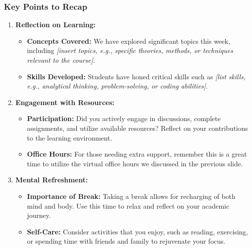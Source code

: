 \documentclass[aspectratio=169]{beamer}
\begin{document}
\begin{frame}[fragile]
    \frametitle{Key Points to Recap}
    \begin{enumerate}
        \item \textbf{Reflection on Learning:}
        \begin{itemize}
            \item \textbf{Concepts Covered:} We have explored significant topics this week, including \textit{[insert topics, e.g., specific theories, methods, or techniques relevant to the course]}.
            \item \textbf{Skills Developed:} Students have honed critical skills such as \textit{[list skills, e.g., analytical thinking, problem-solving, or coding abilities]}.
        \end{itemize}
        
        \item \textbf{Engagement with Resources:}
        \begin{itemize}
            \item \textbf{Participation:} Did you actively engage in discussions, complete assignments, and utilize available resources? Reflect on your contributions to the learning environment.
            \item \textbf{Office Hours:} For those needing extra support, remember this is a great time to utilize the virtual office hours we discussed in the previous slide.
        \end{itemize}
        
        \item \textbf{Mental Refreshment:}
        \begin{itemize}
            \item \textbf{Importance of Break:} Taking a break allows for recharging of both mind and body. Use this time to relax and reflect on your academic journey.
            \item \textbf{Self-Care:} Consider activities that you enjoy, such as reading, exercising, or spending time with friends and family to rejuvenate your focus.
        \end{itemize}
    \end{enumerate}
\end{frame}
\end{document}
